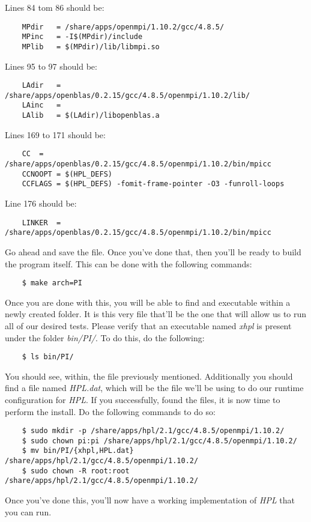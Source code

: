 \documentclass[]{article}
\begin{document}
    Lines 84 tom 86 should be:
    \begin{lstlisting}
    MPdir   = /share/apps/openmpi/1.10.2/gcc/4.8.5/
    MPinc   = -I$(MPdir)/include
    MPlib   = $(MPdir)/lib/libmpi.so
    \end{lstlisting}
    Lines 95 to 97 should be:
    \begin{lstlisting}
    LAdir   = /share/apps/openblas/0.2.15/gcc/4.8.5/openmpi/1.10.2/lib/
    LAinc   =
    LAlib   = $(LAdir)/libopenblas.a
    \end{lstlisting}
    Lines 169 to 171 should be:
    \begin{lstlisting}
    CC  = /share/apps/openblas/0.2.15/gcc/4.8.5/openmpi/1.10.2/bin/mpicc
    CCNOOPT = $(HPL_DEFS)
    CCFLAGS = $(HPL_DEFS) -fomit-frame-pointer -O3 -funroll-loops
    \end{lstlisting}
    Line 176 should be:
    \begin{lstlisting}
    LINKER  = /share/apps/openblas/0.2.15/gcc/4.8.5/openmpi/1.10.2/bin/mpicc
    \end{lstlisting}
    Go ahead and save the file. Once you've done that, then you'll be ready to build the program itself. This 
    can be done with the following commands:
    \begin{lstlisting}
    $ make arch=PI
    \end{lstlisting}
    Once you are done with this, you will be able to find and executable within a newly created folder. It is
    this very file that'll be the one that will allow us to run all of our desired tests. Please verify that an 
    executable named \textit{xhpl} is present under the folder \textit{bin/PI/}. To do this, do the following:
    \begin{lstlisting}
    $ ls bin/PI/
    \end{lstlisting}
    You should see, within, the file previously mentioned. Additionally you should find a file named 
    \textit{HPL.dat}, which will be the file we'll be using to do our runtime configuration for \textit{HPL}. 
    If you successfully, found the files, it is now time to perform the install. Do the following commands to
    do so:
    \begin{lstlisting}
    $ sudo mkdir -p /share/apps/hpl/2.1/gcc/4.8.5/openmpi/1.10.2/
    $ sudo chown pi:pi /share/apps/hpl/2.1/gcc/4.8.5/openmpi/1.10.2/
    $ mv bin/PI/{xhpl,HPL.dat} /share/apps/hpl/2.1/gcc/4.8.5/openmpi/1.10.2/
    $ sudo chown -R root:root /share/apps/hpl/2.1/gcc/4.8.5/openmpi/1.10.2/
    \end{lstlisting}
    Once you've done this, you'll now have a working implementation of \textit{HPL} that you can run.
\end{document}
